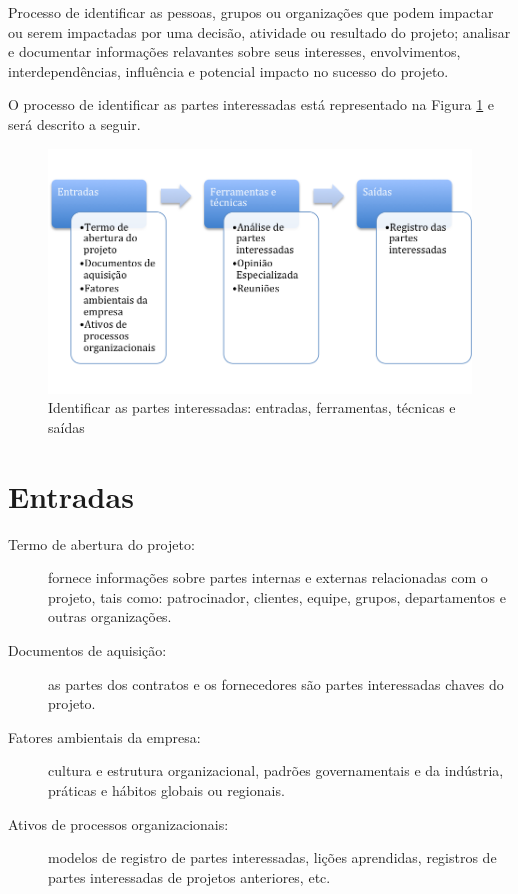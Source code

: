 
Processo de identificar as pessoas, grupos ou organizações que podem impactar ou serem impactadas por uma decisão, atividade ou resultado do projeto; analisar e documentar informações relavantes sobre seus interesses, envolvimentos, interdependências, influência e potencial impacto no sucesso do projeto.

O processo de identificar as partes interessadas está representado na Figura \ref{fig:sh:id:efts} e será descrito a seguir.

\begin{figure}[!h]
	\centering
	\includegraphics[scale=0.5]{Figuras/stakeholders_efts_identificar.png}
	\caption{Identificar as partes interessadas: entradas, ferramentas, técnicas e saídas}
	\label{fig:sh:id:efts}
\end{figure}

\section{Entradas}

\begin{description}

	\item[Termo de abertura do projeto:] fornece informações sobre partes internas e externas relacionadas com o projeto, tais como: patrocinador, clientes, equipe, grupos, departamentos e outras organizações.
	
	\item[Documentos de aquisição:] as partes dos contratos e os fornecedores são partes interessadas chaves do projeto.
	
	\item[Fatores ambientais da empresa:] cultura e estrutura organizacional, padrões governamentais e da indústria, práticas e hábitos globais ou regionais.
	
	\item[Ativos de processos organizacionais:]	modelos de registro de partes interessadas, lições aprendidas, registros de partes interessadas de projetos anteriores, etc.

\end{description}


